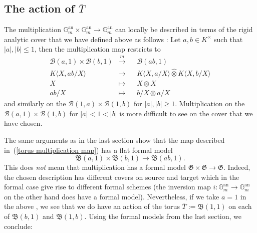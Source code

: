 \documentclass[11pt,oneside]{amsart}
\theoremstyle{definition}
\theoremstyle{remark}
\begin{document}
	\subsection{The action of $\overline{T}$}
	The multiplication $\mathbb G_m^{\operatorname{an}}\times \mathbb G_m^{\operatorname{an}}\rightarrow \mathbb G_m^{\operatorname{an}}$ can locally be described in terms of the rigid analytic cover that we have defined above as follows  : Let $a,b \in K^\times$ such that $|a|,|b|\leq 1$, then the multiplication map restricts to
	\begin{equation}
	\begin{alignedat}{2} \label{torus multiplication map}
	\mathcal B(a,1)\times \mathcal B(b,1)&\xrightarrow{m}&& \mathcal B(ab,1)\\
	K\langle X,ab/X\rangle&\rightarrow &&K\langle X,a/X\rangle\widehat{\otimes} K\langle X,b/X\rangle\\
	X&\mapsto&& X\otimes X\\
	ab/X&\mapsto&& b/X\otimes a/X
	\end{alignedat}
	\end{equation}
	and similarly on the $\mathcal B(1,a)\times \mathcal B(1,b)$ for $|a|,|b|\geq 1$. Multiplication on the $\mathcal B(a,1)\times \mathcal B(1,b)$ for $|a|< 1 < |b|$ is more difficult to see on the cover that we have chosen.
	
	The same arguments as in the last section show that the map described in~(\ref{torus multiplication map}) has a flat formal model
	\[\mathfrak B(a,1)\times \mathfrak B(b,1)\rightarrow \mathfrak B(ab,1).\]
	This does \textit{not} mean that multiplication has a formal model $\mathfrak G\times \mathfrak G\rightarrow \mathfrak G$. Indeed, the chosen description has different covers on source and target which in the formal case give rise to different formal schemes (the inversion map $i:\mathbb G_m^{\operatorname{an}}\rightarrow \mathbb G_m^{\operatorname{an}}$ on the other hand does have a formal model). Nevertheless, if we take $a=1$ in the above , we see that we do have an action of the torus $\overline{T}:=\mathfrak B(1,1)$ on each of $\mathfrak B(b,1)$ and $\mathfrak B(1,b)$. Using the formal models from the last section, we conclude:
	
\end{document}
